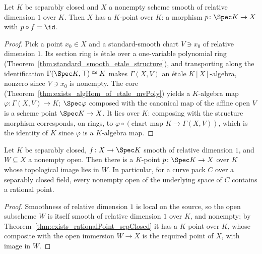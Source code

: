 \begin{theorem}
  \label{thm:exists_rationalPoint_sepClosed}
  \leanok
  Let \(K\) be separably closed and \(X\) a nonempty scheme smooth of relative dimension
  \(1\) over \(K\). Then \(X\) has a \(K\)-point over \(K\): a morphism
  \(p \colon \Spec K \to X\) with \(p \circ f = \id\).
\end{theorem}
\begin{proof}
  \leanok
  Pick a point \(x_0 \in X\) and a standard-smooth chart \(V \ni x_0\) of relative
  dimension \(1\). Its section ring is \'etale over a one-variable polynomial ring
  (Theorem~\ref{thm:standard_smooth_etale_structure}), and transporting along the
  identification \(\Gamma(\Spec K, \top) \cong K\) makes \(\Gamma(X, V)\) an \'etale
  \(K[X]\)-algebra, nonzero since \(V \ni x_0\) is nonempty. The core
  (Theorem~\ref{thm:exists_algHom_of_etale_mvPoly}) yields a \(K\)-algebra map
  \(\varphi \colon \Gamma(X,V) \to K\); \(\Spec\varphi\) composed with the canonical map of
  the affine open \(V\) is a scheme point \(\Spec K \to X\). It lies over \(K\): composing
  with the structure morphism corresponds, on rings, to
  \(\varphi \circ (\text{chart map } K \to \Gamma(X,V))\), which is the identity of \(K\)
  since \(\varphi\) is a \(K\)-algebra map.
\end{proof}

\begin{theorem}
  \label{thm:exists_rationalPoint_mem}
  \leanok
  Let \(K\) be separably closed, \(f \colon X \to \Spec K\) smooth of relative dimension
  \(1\), and \(W \subseteq X\) a nonempty open. Then there is a \(K\)-point
  \(p \colon \Spec K \to X\) over \(K\) whose topological image lies in \(W\). In
  particular, for a curve pack \(C\) over a separably closed field, every nonempty open of
  the underlying space of \(C\) contains a rational point.
\end{theorem}
\begin{proof}
  \leanok
  Smoothness of relative dimension \(1\) is local on the source, so the open subscheme
  \(W\) is itself smooth of relative dimension \(1\) over \(K\), and nonempty; by
  Theorem~\ref{thm:exists_rationalPoint_sepClosed} it has a \(K\)-point over \(K\), whose
  composite with the open immersion \(W \to X\) is the required point of \(X\), with image
  in \(W\).
\end{proof}

